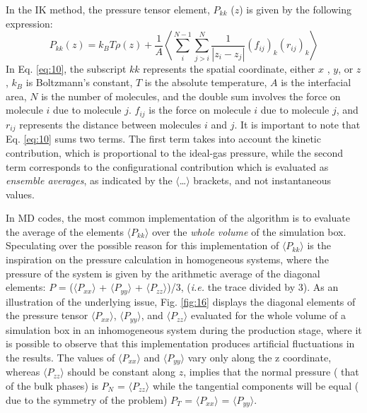 \documentclass[9pt,bestpractices]{livecoms}
\begin{document}
In the IK method, the pressure tensor element, $P_{kk}$ ($z$) is given by the following expression:
\begin{equation}
P_{kk}\left(z\right)=k_{B}T\rho\left(z\right)+\frac{1}{A}\left\langle \sum_{{\scriptstyle i}}^{{\scriptstyle N-1}}\sum_{{\scriptstyle j>i}}^{N}\frac{1}{\left|z_{i}-z_{j}\right|}\left(f_{ij}\right)_{k}\left(r_{ij}\right)_{k}\right\rangle 
  \label{eq:10}
\end{equation}
In Eq. \ref{eq:10}, the subscript $kk$ represents the spatial coordinate, either
$x$ , $y$, or $z$ , $k_{B}$ is Boltzmann's
constant, $T$ is the absolute temperature, $A$ is the interfacial
area, $N$ is the number of molecules, and the double sum involves the
force on molecule $i$ due to molecule $j$. $f_{ij}$ is
the force on molecule $i$ due to molecule $j$, and
$r_{ij}$ represents the distance between molecules $i$ and
$j$. It is important to note that Eq. \ref{eq:10} sums two terms.
The first term takes into account the kinetic contribution, which is
proportional to the ideal-gas pressure, while the second term corresponds to
the configurational contribution which is evaluated as \textit{ensemble averages}, as
indicated by the ${\langle}${\ldots}${\rangle}$ brackets, and not instantaneous
values.

In MD codes, the most common implementation of the algorithm is to evaluate the
average of the elements ${\langle}P_{kk}{\rangle}$ over the \textit{whole
volume} of the simulation box. Speculating over the possible reason for this
implementation of ${\langle}P_{kk}{\rangle}$ is the inspiration on
the pressure calculation in homogeneous systems, where the pressure of the
system is given by the arithmetic average of the diagonal elements: $P$
= (${\langle}P_{xx}{\rangle}$
+ ${\langle}P_{yy}{\rangle}$
+ ${\langle}P_{zz}{\rangle}$)/3, (\textit{i.e.} the trace divided by 3). As an illustration of the
underlying issue, Fig. \ref{fig:16} displays the diagonal elements of the pressure
tensor ${\langle}P_{xx}{\rangle}$,
${\langle}P_{yy}{\rangle}$, and
${\langle}P_{zz}{\rangle}$ evaluated for the whole volume of
a simulation box in an inhomogeneous system during the production stage, where
it is possible to observe that this implementation produces artificial
fluctuations in the results.  The values of
${\langle}P_{xx}{\rangle}$ and
${\langle}P_{yy}{\rangle}$ vary only along the z coordinate,
whereas ${\langle}P_{zz}{\rangle}$ should be constant along
$z$,  implies that the normal pressure ( that of the bulk phases) is
$P_{N}$ = ${\langle}P_{zz}{\rangle}$ while the tangential
components will be equal ( due to the symmetry of the problem)
$P_{T}$ = ${\langle}P_{xx}{\rangle}$
= ${\langle}P_{yy}{\rangle}$. 
\end{document}
